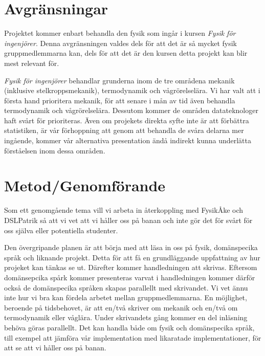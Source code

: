 \documentclass[12pt,a4paper]{article}
\begin{document}
\section{Avgränsningar}

Projektet kommer enbart behandla den fysik som ingår i kursen \textit{Fysik för ingenjörer}. Denna avgränsningen valdes dels för att det är så mycket fysik gruppmedlemmarna kan, dels för att det är den kursen detta projekt kan blir mest relevant för.

\textit{Fysik för ingenjörer} behandlar grunderna inom de tre områdena mekanik (inklusive stelkroppsmekanik), termodynamik och vågrörelselära. Vi har valt att i första hand prioritera mekanik, för att senare i mån av tid även behandla termodynamik och vågrörelselära. Dessutom kommer de områden datateknologer haft svårt för prioriteras. Även om projekets direkta syfte inte är att förbättra statistiken, är vår förhoppning att genom att behandla de svåra delarna mer ingående, kommer vår alternativa presentation ändå indirekt kunna underlätta förståelsen inom dessa områden.





\section{Metod/Genomförande}

Som ett genomgående tema vill vi arbeta in återkoppling med FysikÅke och DSLPatrik så att vi vet att vi håller oss på banan och inte gör det för svårt för oss själva eller potentiella studenter.

Den övergripande planen är att börja med att läsa in oss på fysik, domänspecika språk och liknande projekt. Detta för att få en grundläggande uppfattning av hur projeket kan tänkas se ut. Därefter kommer handledningen att skrivas. Eftersom domänsepcika spårk kommer presenteras varvat i handledningen kommer därför också de domänspecika språken skapas parallellt med skrivandet. Vi vet ännu inte hur vi bra kan fördela arbetet mellan gruppmedlemmarna. En möjlighet, beroende på tidsbehovet, är att en/två skriver om mekanik och en/två om termodynamik eller våglära. Under skrivandets gång kommer en del inläsning behöva göras parallellt. Det kan handla både om fysik och domänspecika språk, till exempel att jämföra vår implementation med likaratade implementationer, för att se att vi håller oss på banan.
\end{document}
